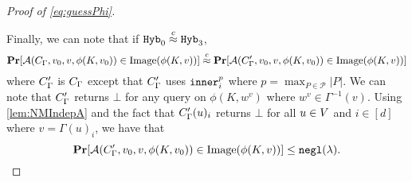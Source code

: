 \begin{proof}[Proof of \cref{eq:guessPhi}]
\begin{itemize}
\begin{itemize}
		\end{itemize}
	\end{itemize}
	Finally, we can note that if $\texttt{Hyb}_0 \overset{c}{\approx} \texttt{Hyb}_3$,
	\begin{equation*}
		\operatorname*{\mathbf{Pr}}[\mathcal{A}(C_\Gamma, v_0, v, \phi(K, v_0)) \in \text{Image}(\phi(K, v))] 
		\overset{c}{\approx}
		\operatorname*{\mathbf{Pr}}[\mathcal{A}(C_\Gamma', v_0, v, \phi(K, v_0)) \in \text{Image}(\phi(K, v))] 
	\end{equation*}
	where $C_\Gamma'$ is $C_\Gamma$ except that $C_\Gamma'$ uses $\texttt{inner}_i^p$ where $p = \max_{P \in \mathcal{P}} |P|$.
	We can note that $C_\Gamma'$ returns $\bot$ for any query on $\phi(K, w^v)$ where $w^v \in \Gamma^{-1}(v)$.
	Using \cref{lem:NMIndepA} and the fact that $C_\Gamma'(u)_i$ returns $\bot$ for all $u \in V$ and $i \in [d]$ where $v = \Gamma(u)_i$, we have that
	$$
		\operatorname*{\mathbf{Pr}}[\mathcal{A}(C_\Gamma', v_0, v, \phi(K, v_0)) \in \text{Image}(\phi(K, v))] \leq \texttt{negl}(\lambda).
	$$
	
\end{proof}

